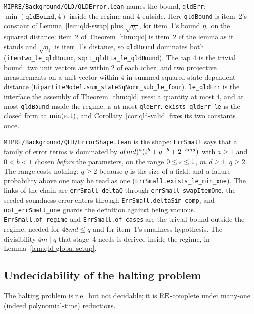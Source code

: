 \texttt{MIPRE/Background/QLD/QLDError.lean} names the bound, \texttt{qldErr}:
$\min(\texttt{qldBound}, 4)$ inside the regime and $4$ outside. Here \texttt{qldBound} is item~2's
constant of Lemma~\ref{lem:qld-swap} plus $\sqrt{\eta_1}$, for item~1's bound $\eta_1$ on the
squared distance: item~2 of Theorem~\ref{thm:qld} is item~2 of the lemma as it stands and
$\sqrt{\eta_1}$ is item~1's distance, so \texttt{qldBound} dominates both
(\texttt{itemTwo\_le\_qldBound}, \texttt{sqrt\_qldEta\_le\_qldBound}). The cap $4$ is the trivial
bound: two unit vectors are within $2$ of each other, and two projective measurements on a unit
vector within $4$ in summed squared state-dependent distance
(\texttt{BipartiteModel.sum\_stateSqNorm\_sub\_le\_four}). \texttt{le\_qldErr} is the interface the
assembly of Theorem~\ref{thm:qld} uses: a quantity at most $4$, and at most \texttt{qldBound} inside
the regime, is at most \texttt{qldErr}. \texttt{exists\_qldErr\_le} is the closed form at
$\min(\varepsilon, 1)$, and Corollary~\ref{cor:qld-valid} fixes its two constants once.

\texttt{MIPRE/Background/QLD/ErrorShape.lean} is the shape: \texttt{ErrSmall} says that a family of
error terms is dominated by $a(md)^a(\varepsilon^b + q^{-b} + 2^{-bmd})$ with $a \geq 1$ and $0 < b < 1$
chosen \emph{before} the parameters, on the range $0 \leq \varepsilon \leq 1$, $m, d \geq 1$, $q \geq 2$.
The range costs nothing: $q \geq 2$ because $q$ is the size of a field, and a failure probability
above one may be read as one (\texttt{ErrSmall.exists\_le\_min\_one}). The links of the chain are
\texttt{errSmall\_deltaQ} through \texttt{errSmall\_swapItemOne}, the seeded soundness error
enters through \texttt{ErrSmall.deltaSim\_comp}, and \texttt{not\_errSmall\_one} guards the
definition against being vacuous. \texttt{ErrSmall.of\_regime} and \texttt{ErrSmall.of\_cases} are
the trivial bound outside the regime, needed for $48md \leq q$ and for item~1's smallness
hypothesis. The divisibility $4m \mid q$ that stage~4 needs is derived inside the regime, in
Lemma~\ref{lem:qld-global-setup}.

\subsection{Undecidability of the halting problem}
\label{sec:rr-halting}

\effortMathlib

\begin{theorem}[Turing]
\label{thm:halting-undecidable}
\leanok
The halting problem is r.e.\ but not decidable; it is $\mathrm{RE}$-complete under many-one
(indeed polynomial-time) reductions.
\end{theorem}

